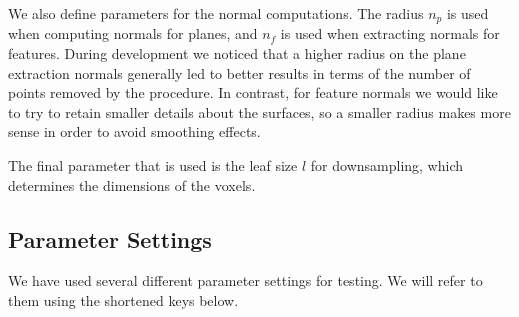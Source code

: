 \documentclass[11pt,a4paper]{kth-mag}
\begin{document}
We also define parameters for the normal computations. The radius $n_p$ is used
when computing normals for planes, and $n_f$ is used when extracting normals for
features. During development we noticed that a higher radius on the plane
extraction normals generally led to better results in terms of the number of
points removed by the procedure. In contrast, for feature normals we would like
to try to retain smaller details about the surfaces, so a smaller radius makes
more sense in order to avoid smoothing effects.

The final parameter that is used is the leaf size $l$ for downsampling, which
determines the dimensions of the voxels.

\subsection{Parameter Settings}
We have used several different parameter settings for testing. We will refer to
them using the shortened keys below.
\end{document}
